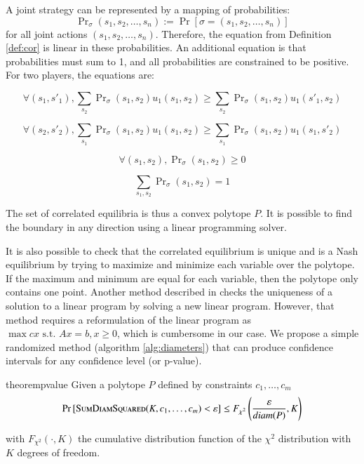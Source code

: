 \documentclass[preprint,12pt,authoryear,doubleblind]{elsarticle}
\theoremstyle{definition}
\begin{document}
A joint strategy can be represented by a mapping of probabilities: $$\Pr\nolimits_\sigma(s_1, s_2, \ldots, s_n) := \Pr[\sigma = (s_1, s_2, \ldots, s_n)]$$ for all joint actions $(s_1, s_2, \ldots, s_n)$. Therefore, the equation from Definition \ref{def:cor} is linear in these probabilities. An additional equation is that probabilities must sum to 1, and all probabilities are constrained to be positive. For two players, the equations are:

$$\forall (s_1, s'_1), \sum_{s_2} \Pr\nolimits_\sigma(s_1, s_2) u_1(s_1, s_2) \ge \sum_{s_2} \Pr\nolimits_\sigma(s_1, s_2) u_1(s'_1, s_2)$$

$$\forall (s_2, s'_2), \sum_{s_1} \Pr\nolimits_\sigma(s_1, s_2) u_1(s_1, s_2) \ge \sum_{s_1} \Pr\nolimits_\sigma(s_1, s_2) u_1(s_1, s'_2)$$

$$\forall (s_1, s_2), \Pr\nolimits_\sigma(s_1, s_2) \ge 0$$

$$\sum_{s_1,s_2} \Pr\nolimits_\sigma(s_1, s_2) = 1$$


The set of correlated equilibria is thus a convex polytope $P$. It is possible to find the boundary in any direction using a linear programming solver.

It is also possible to check that the correlated equilibrium is unique and is a Nash equilibrium by trying to maximize and minimize each variable over the polytope. If the maximum and minimum are equal for each variable, then the polytope only contains one point. Another method described in \citet{appa2002uniqueness} checks the uniqueness of a solution to a linear program by solving a new linear program. However, that method requires a reformulation of the linear program as $\max cx \text{ s.t. } Ax=b, x \ge 0$, which is cumbersome in our case. We propose a simple randomized method (algorithm \ref{alg:diameters}) that can produce confidence intervals for any confidence level (or p-value).

\begin{restatable}{theorem}{pvalue}
\label{thm:pvalue}
Given a polytope $P$ defined by constraints $c_1, \ldots, c_m$
 $$
        \Pr\left[\textsc{SumDiamSquared}(K, c_1, \ldots, c_m) < \varepsilon\right] \le F_{\chi^2}\left(\frac{\varepsilon}{diam(P)}, K\right)
   $$

   with $F_{\chi^2}(\cdot, K)$ the cumulative distribution function of the $\chi^2$ distribution with $K$ degrees of freedom.
\end{restatable}
\end{document}
